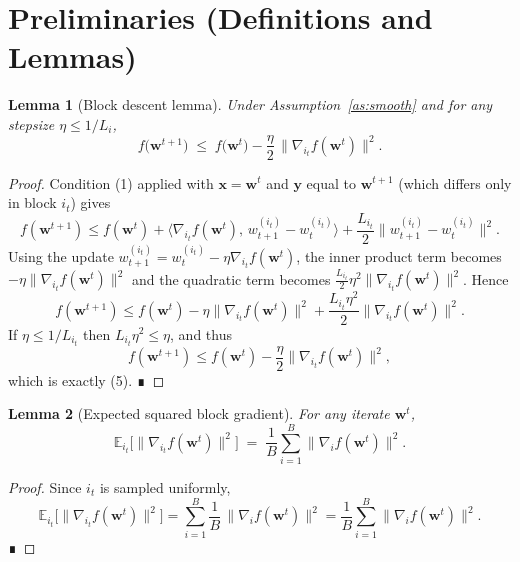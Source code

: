 \documentclass{article}
\newtheorem{lemma}{Lemma}
\newcommand{\E}{\mathbb{E}}
\begin{document}
\vspace{1em}
\section*{Preliminaries (Definitions and Lemmas)}
\begin{lemma}[Block descent lemma]\label{lem:descent}
Under Assumption~\ref{as:smooth} and for any stepsize $\eta\le 1/L_i$,
\[
f\!\big(\bm w^{t+1}\big)
\;\le\;
f\!\big(\bm w^{t}\big)
-\frac{\eta}{2}\,\|\nabla_{i_t} f(\bm w^{t})\|^{2}.
\tag{5}
\]
\end{lemma}
\begin{proof}
Condition (1) applied with $\bm x=\bm w^{t}$ and $\bm y$ equal to $\bm w^{t+1}$
(which differs only in block $i_t$) gives
\[
f(\bm w^{t+1})\le f(\bm w^{t})
+\big\langle\nabla_{i_t}f(\bm w^{t}),\,
w^{(i_t)}_{t+1}-w^{(i_t)}_{t}\big\rangle
+\frac{L_{i_t}}{2}\|w^{(i_t)}_{t+1}-w^{(i_t)}_{t}\|^{2}.
\]
Using the update $w^{(i_t)}_{t+1}=w^{(i_t)}_{t}-\eta\nabla_{i_t}f(\bm w^{t})$,
the inner product term becomes $-\eta\|\nabla_{i_t}f(\bm w^{t})\|^{2}$ and the
quadratic term becomes $\frac{L_{i_t}}{2}\eta^{2}\|\nabla_{i_t}f(\bm w^{t})\|^{2}$.
Hence
\[
f(\bm w^{t+1})\le f(\bm w^{t})
-\eta\|\nabla_{i_t}f(\bm w^{t})\|^{2}
+\frac{L_{i_t}\eta^{2}}{2}\|\nabla_{i_t}f(\bm w^{t})\|^{2}.
\]
If $\eta\le 1/L_{i_t}$ then $L_{i_t}\eta^{2}\le\eta$, and thus
\[
f(\bm w^{t+1})\le f(\bm w^{t})
-\frac{\eta}{2}\|\nabla_{i_t}f(\bm w^{t})\|^{2},
\]
which is exactly (5). ∎
\end{proof}

\begin{lemma}[Expected squared block gradient]\label{lem:expgrad}
For any iterate $\bm w^{t}$,
\[
\E_{i_t}\big[\|\nabla_{i_t} f(\bm w^{t})\|^{2}\big]
\;=\;
\frac{1}{B}\sum_{i=1}^{B}\|\nabla_{i} f(\bm w^{t})\|^{2}.
\tag{6}
\]
\end{lemma}
\begin{proof}
Since $i_t$ is sampled uniformly,
\[
\E_{i_t}\big[\|\nabla_{i_t} f(\bm w^{t})\|^{2}\big]
=\sum_{i=1}^{B}\frac{1}{B}\,\|\nabla_{i} f(\bm w^{t})\|^{2}
=\frac{1}{B}\sum_{i=1}^{B}\|\nabla_{i} f(\bm w^{t})\|^{2}.
\tag{7}
\]
∎
\end{proof}
\end{document}
